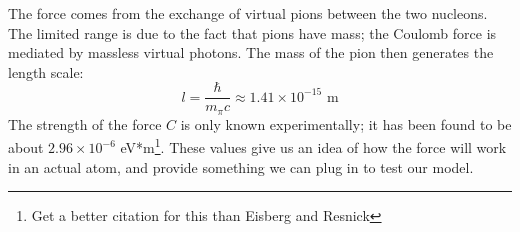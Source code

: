 \documentclass[12pt,twoside]{reedthesis}
\newcommand{\eqn}[1]{\begin{equation}#1\end{equation}}
\begin{document}
The force comes from the exchange of virtual pions between the two nucleons. The limited range is due to the fact that pions have mass; the Coulomb force is mediated by massless virtual photons. The mass of the pion then generates the length scale:
\eqn{
l = \frac{\hbar}{m_{\pi}c} \approx 1.41 \times 10^{-15}\mbox{ m}
}
The strength of the force $C$ is only known experimentally; it has been found to be about $2.96 \times 10^{-6}$ eV*m\cite{ER}\footnote{Get a better citation for this than Eisberg and Resnick}. These values give us an idea of how the force will work in an actual atom, and provide something we can plug in to test our model.
%
%
%	
%
%
%
%
\backmatter %
%
%
   \nocite{*}
   

\end{document}
